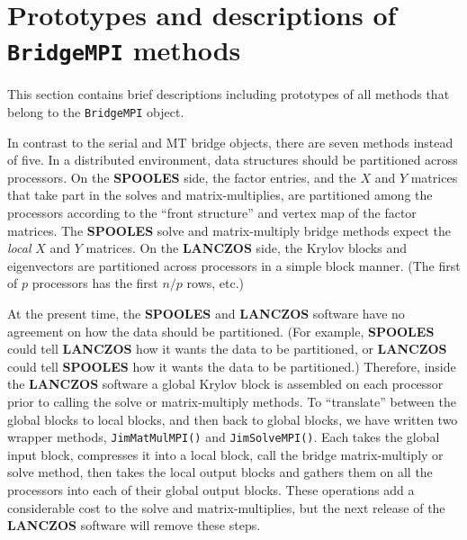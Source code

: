 \section{Prototypes and descriptions of \texttt{BridgeMPI} methods}
\label{section:BridgeMPI:proto}
\par
This section contains brief descriptions including prototypes
of all methods that belong to the {\tt BridgeMPI} object.
\par
In contrast to the serial and MT bridge objects, there are seven
methods instead of five.
In a distributed environment, data structures should be partitioned
across processors.
On the {\bf SPOOLES} side, the factor entries, and the $X$ and $Y$
matrices that take part in the solves and matrix-multiplies, are
partitioned among the processors according to the ``front structure'' 
and vertex map of the factor matrices.
The {\bf SPOOLES} solve and matrix-multiply bridge methods expect 
the {\it local} $X$ and $Y$ matrices.
On the {\bf LANCZOS} side, the Krylov blocks and eigenvectors are
partitioned across processors in a simple block manner.
(The first of $p$ processors has the first $n/p$ rows, etc.)
\par
At the present time, the {\bf SPOOLES} and {\bf LANCZOS} software
have no agreement on how the data should be partitioned.
(For example, {\bf SPOOLES} could tell {\bf LANCZOS} how it wants
the data to be partitioned, 
or {\bf LANCZOS} could tell {\bf SPOOLES} how it wants
the data to be partitioned.)
Therefore, inside the {\bf LANCZOS} software a global Krylov block
is assembled on each processor prior to calling the solve or 
matrix-multiply methods.
To ``translate'' between the global blocks to local blocks, and
then back to global blocks, we have written two wrapper methods,
{\tt JimMatMulMPI()} and {\tt JimSolveMPI()}.
Each takes the global input block, compresses it into a local
block, call the bridge matrix-multiply or solve method,
then takes the local output blocks and gathers them on all the
processors into each of their global output blocks.
These operations add a considerable cost to the solve and
matrix-multiplies, but the next release of the {\bf LANCZOS}
software will remove these steps. 
\par
